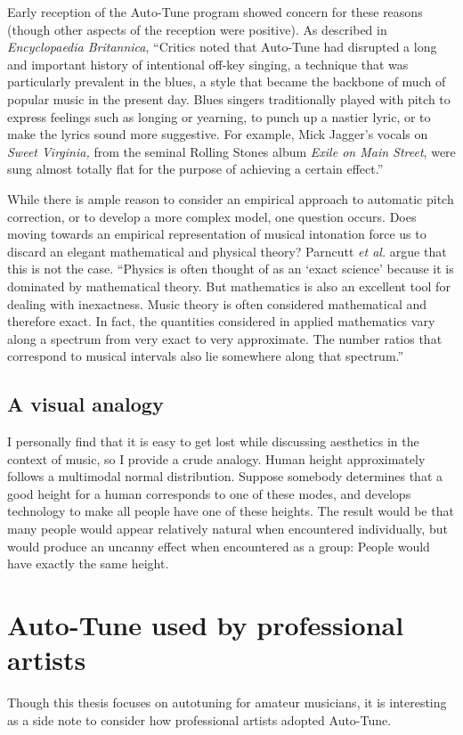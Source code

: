 Early reception of the Auto-Tune program showed concern for these reasons (though other aspects of the reception were positive). As described in \textit{Encyclopaedia Britannica}, ``Critics noted that Auto-Tune had disrupted a long and important history of intentional off-key singing, a technique that was particularly prevalent in the blues, a style that became the backbone of much of popular music in the present day. Blues singers traditionally played with pitch to express feelings such as longing or yearning, to punch up a nastier lyric, or to make the lyrics sound more suggestive. For example, Mick Jagger’s vocals on \textit{Sweet Virginia,} from the seminal Rolling Stones album \textit{Exile on Main Street}, were sung almost totally flat for the purpose of achieving a certain effect.'' \cite{autotuneBritannica}
 
While there is ample reason to consider an empirical approach to automatic pitch correction, or to develop a more complex model, one question occurs. Does moving towards an empirical representation of musical intonation force us to discard an elegant mathematical and physical theory? Parncutt \textit{et al.} argue that this is not the case. ``Physics is often thought of as an `exact science' because it is dominated by mathematical theory. But mathematics is also an excellent tool for dealing with inexactness. Music theory is often considered mathematical and therefore exact. In fact, the quantities considered in applied mathematics vary along a spectrum from very exact to very approximate. The number ratios that correspond to musical intervals also lie somewhere along that spectrum.''

\subsection{A visual analogy}
I personally find that it is easy to get lost while discussing aesthetics in the context of music, so I provide a crude analogy. Human height approximately follows a multimodal normal distribution. Suppose somebody determines that a good height for a human corresponds to one of these modes, and develops technology to make all people have one of these heights. The result would be that many people would appear relatively natural when encountered individually, but would produce an uncanny effect when encountered as a group: People would have exactly the same height. 

\section{Auto-Tune used by professional artists}
Though this thesis focuses on autotuning for amateur musicians, it is interesting as a side note to consider how professional artists adopted Auto-Tune.

